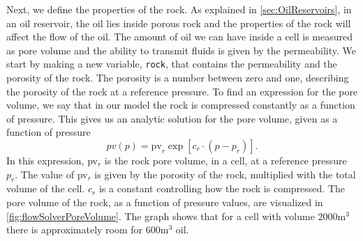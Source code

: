 Next, we define the properties of the rock. As explained in \autoref{sec:OilReservoirs}, in an oil reservoir, the oil lies inside porous rock and the properties of the rock will affect the flow of the oil. The amount of oil we can have inside a cell is measured as pore volume and the ability to transmit fluids is given by the permeability. We start by making a new variable, \texttt{rock}, that contains the permeability and the porosity of the rock. The porosity is a number between zero and one, describing the porosity of the rock at a reference pressure. To find an expression for the pore volume, we say that in our model the rock is compressed constantly as a function of pressure. This gives us an analytic solution for the pore volume, given as a function of pressure
\begin{equation}
    pv(p) = \text{pv}_r \exp[c_r\cdot(p-p_r)].
    \label{eq:poreVolume}
\end{equation}
In this expression, pv$_r$ is the rock pore volume, in a cell, at a reference pressure $p_r$. The value of pv$_r$ is given by the porosity of the rock, multiplied with the total volume of the cell. $c_r$ is a constant controlling how the rock is compressed. The pore volume of the rock, as a function of pressure values, are visualized in \autoref{fig:flowSolverPoreVolume}. The graph shows that for a cell with volume $2000\text{m}^3$ there is approximately room for $600\text{m}^3$ oil.

